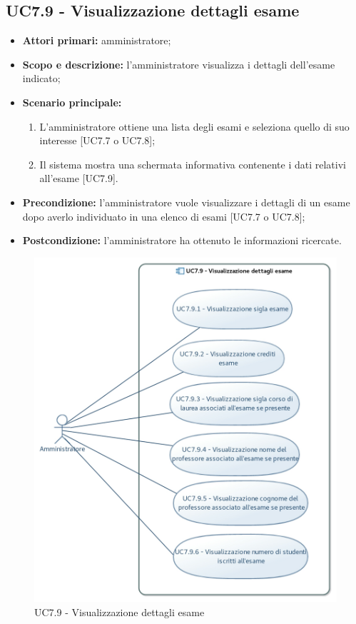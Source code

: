 \documentclass[AnalisiDeiRequisiti.tex]{subfiles}
\begin{document}
\subsection{UC7.9 - Visualizzazione dettagli esame}
\begin{itemize}
	\item \textbf{Attori primari:} amministratore;
	\item \textbf{Scopo e descrizione:} l'amministratore visualizza i dettagli dell'esame indicato;
	\item \textbf{Scenario principale:}
	\begin{enumerate}
		\item L'amministratore ottiene una lista degli esami e seleziona quello di suo interesse [UC7.7 o UC7.8];
		\item Il sistema mostra una schermata informativa contenente i dati relativi all'esame [UC7.9].
	\end{enumerate}
	\item \textbf{Precondizione:} l'amministratore vuole visualizzare i dettagli di un esame dopo averlo individuato in una elenco di esami [UC7.7 o UC7.8]; 
	\item \textbf{Postcondizione:} l'amministratore ha ottenuto le informazioni ricercate.
\end{itemize}
\begin{figure}[H]
	\centering
	\includegraphics[width=0.7\linewidth]{UC7_9.jpg}
	\caption{UC7.9 - Visualizzazione dettagli esame}
	\label{fig:UC7.9 - Visualizzazione dettagli esame}
\end{figure}
\end{document}
